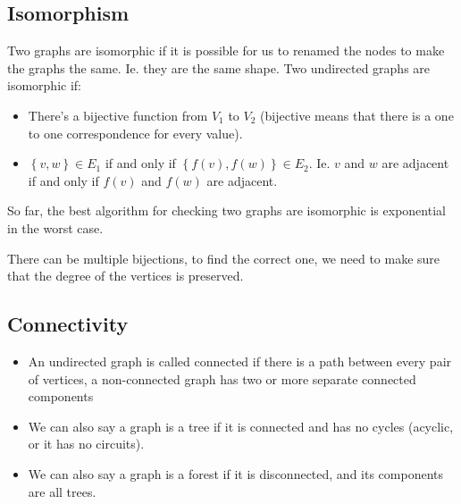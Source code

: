 \subsection{Isomorphism}\label{sub:isomorphism}

Two graphs are isomorphic if it is possible for us to renamed the nodes to make the graphs the same.
Ie. they are the same shape.
Two undirected graphs are isomorphic if:
\begin{itemize}
    \item There's a bijective function from \(V_1\) to \(V_2\) (bijective means that there is a one to one correspondence for every value).
    \item \(\left\{ v, w \right\} \in E_1\) if and only if \(\left\{ f(v), f(w) \right\} \in E_2\).
          Ie. \(v\) and \(w\) are adjacent if and only if \(f(v)\) and \(f(w)\) are adjacent.
\end{itemize}
So far, the best algorithm for checking two graphs are isomorphic is exponential in the worst case.
\begin{note}
    There can be multiple bijections, to find the correct one, we need to make sure that the degree of the vertices is preserved.
\end{note}

\subsection{Connectivity}\label{sub:pa13_connectivity}

\begin{itemize}
    \item An undirected graph is called connected if there is a path between every pair of vertices, a non-connected graph has two or more separate connected components
    \item We can also say a graph is a tree if it is connected and has no cycles (acyclic, or it has no circuits).
    \item We can also say a graph is a forest if it is disconnected, and its components are all trees.
\end{itemize}



